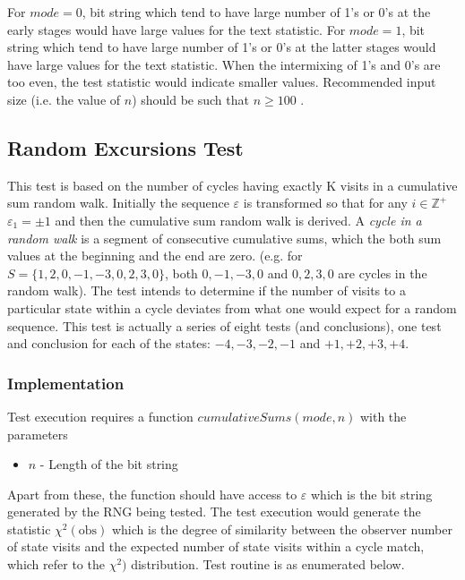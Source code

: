 For $mode=0$, bit string which tend to have large number of 1's or 0's at the early stages would have large values for the text statistic. For $mode=1$, bit string which tend to have large number of 1's or 0's at the latter stages would have large values for the text statistic. When the intermixing of 1's and 0's are too even, the test statistic would indicate smaller values. Recommended input size (i.e. the value of $n$) should be such that $n \geq 100$ \cite{rep_nist_sp_80022}.

\subsection{Random Excursions Test}

This test is based on the number of cycles having exactly K visits in a cumulative sum random walk. Initially the sequence $\varepsilon$ is transformed so that for any $i\in\mathbb{Z}^+$ $\varepsilon_1=\pm1$ and then the cumulative sum random walk is derived. A \textit{cycle in a random walk} is a segment of consecutive cumulative sums, which the both sum values at the beginning and the end are zero. (e.g. for $S=\{1,2,0,-1,-3,0,2,3,0\}$, both $0,-1,-3,0$ and $0,2,3,0$ are cycles in the random walk). The test intends to determine if the number of visits to a particular state within a cycle deviates from what one would expect for a random sequence. This test is actually a series of eight tests (and conclusions), one test and conclusion for each of the states: $-4, -3, -2, -1$ and $+1, +2, +3, +4$.

\subsubsection{Implementation}

Test execution requires a function $cumulativeSums(mode,n)$ with the parameters

\begin{itemize}
    \item $n$ - Length of the bit string
\end{itemize}

Apart from these, the function should have access to $\varepsilon$ which is the bit string generated by the RNG being tested. The test execution would generate the statistic $\chi^2(\text{obs})$ which is the degree of similarity between the observer number of state visits and the expected number of state visits within a cycle match, which refer to the $\chi^2)$ distribution. Test routine is as enumerated below.

